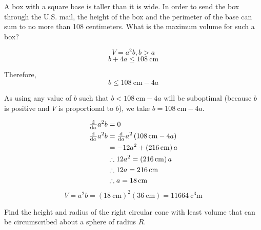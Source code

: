\documentclass[a4paper, titlepage]{article}
\begin{document}
\begin{Exercise}
A box with a square base is taller than it is wide. In order
to send the box through the U.S. mail, the height of the box
and the perimeter of the base can sum to no more than 108
centimeters. What is the maximum volume for such a box?
\cite{anton-bivens-davis}
\end{Exercise}

\begin{Answer}

\[V = a^2 b, b > a\]
\[b + 4a \le \SI{108}{\centi\meter}\]

Therefore,
\[b \le \SI{108}{\centi\meter} - 4a\]

As using any value of \(b\) such that \(b < \SI{108}{\centi\meter} - 4a\)
will be suboptimal (because \(b\) is positive and \(V\) is proportional to \(b\)),
we take \(b = \SI{108}{\centi\meter} - 4a\).

\begin{align*}
  \od{}{a} a^2 b &= 0 \\
  \od{}{a} a^2 b &= \od{}{a} a^2 \left( \SI{108}{\centi\meter} - 4a \right) \\
                 &= -12 a^2 + \left( \SI{216}{\centi\meter} \right) a \\
                 &\therefore 12 a^2 = \left( \SI{216}{\centi\meter} \right) a \\
                 &\therefore 12 a = \SI{216}{\centi\meter} \\
                 &\therefore a = \SI{18}{\centi\meter}
\end{align*}
\[V = a^2 b = \left( \SI{18}{\centi\meter} \right)^2 \left( \SI{36}{\centi\meter} \right)
            = \SI{11664}{\cubic\centi\meter}\]
\end{Answer}

\begin{Exercise}
Find the height and radius of the right circular cone with
least volume that can be circumscribed about a sphere of
radius \(R\).
\cite{anton-bivens-davis}
\end{Exercise}
\end{document}
